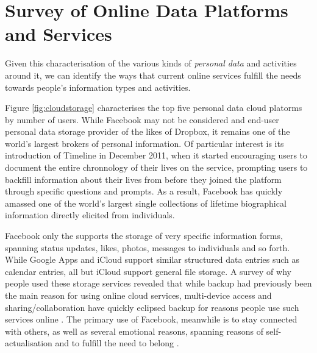 \documentclass[runningheads,a4paper]{llncs}
\begin{document}
\section{Survey of Online Data Platforms and Services}

Given this characterisation of the various kinds of \emph{personal data} and activities around it, we can identify the ways that current online services fulfill the needs towards people's information types and activities.

Figure \ref{fig:cloudstorage} characterises the top five personal data cloud platorms by number of users. While Facebook may not be considered and end-user personal data storage provider of the likes of Dropbox, it remains one of the world's largest brokers of personal information.  Of particular interest is its introduction of Timeline in December 2011, when it started encouraging users to document the entire chronnology of their lives on the service, prompting users to backfill information about their lives from before they joined the platform through specific questions and prompts.  As a result, Facebook has quickly amassed one of the world's largest single collections of lifetime biographical information directly elicited from individuals.

Facebook only the supports the storage of very specific information forms, spanning status updates, likes, photos, messages to individuals and so forth.  While Google Apps and iCloud support similar structured data entries such as calendar entries, all but iCloud support general file storage.  A survey of why people used these storage services revealed that while backup had previously been the main reason for using online cloud services, multi-device access and sharing/collaboration have quickly eclipsed backup for reasons people use such services online \cite{listitstudy}. The primary use of Facebook, meanwhile is to stay connected with others, as well as several emotional reasons, spanning reasons of self-actualisation and to fulfill the need to belong \cite{why-do-people-facebook}.
\end{document}
